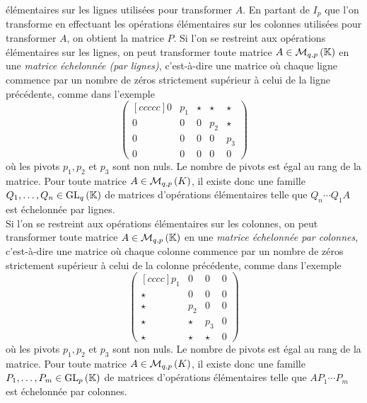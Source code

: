 \documentclass{magnolia}
\begin{document}
\begin{remarques}
  élémentaires sur les lignes utilisées pour transformer $A$. En partant de $I_p$ que
  l'on transforme en effectuant les opérations élémentaires sur les colonnes
  utilisées pour transformer $A$, on obtient la matrice $P$.
\remarque Si l'on se restreint aux opérations élémentaires sur les lignes, on peut
  transformer toute matrice $A\in\mathcal{M}_{q,p}\left(\mathbb{K}\right)$ en une \emph{matrice échelonnée
  (par lignes)}, c'est-à-dire une matrice où chaque ligne commence par un nombre de zéros
  strictement supérieur à celui de la ligne précédente, comme dans l'exemple
  \[\begin{pmatrix}[ccccc]
            0 & p_1     & \star &   \star & \star \\
            0 &       0 &     0 &   p_2   & \star \\
            0 &       0 &     0 &     0   & p_3\\
            0 &       0 &     0 &     0   & 0
  \end{pmatrix}\]
  où les pivots $p_1, p_2$ et $p_3$ sont non nuls. Le nombre de pivots est
  égal au rang de la matrice.
 Pour toute matrice $A\in\mathcal{M}_{q,p}\left(K\right)$, il
  existe donc une famille $Q_1,\ldots,Q_n\in{\rm GL}_{q}\left(\mathbb{K}\right)$ de matrices d'opérations
  élémentaires telle que $Q_n\cdots Q_1A$ est échelonnée par lignes.\\
\remarque Si l'on se restreint aux opérations élémentaires sur les colonnes,
  on peut transformer toute matrice $A\in\mathcal{M}_{q,p}\left(\mathbb{K}\right)$ en une
  \emph{matrice échelonnée par colonnes},
  c'est-à-dire une matrice où chaque colonne commence par un nombre de zéros
  strictement supérieur à celui de la colonne précédente, comme dans l'exemple
  \[\begin{pmatrix}[cccc]
            p_1   &     0 &   0   & 0\\
            \star &     0 &   0   & 0\\
            \star &   p_2 &   0   & 0\\
            \star & \star & p_3   & 0\\
            \star & \star & \star & 0
  \end{pmatrix}\]
  où les pivots $p_1, p_2$ et $p_3$ sont non nuls. Le nombre de pivots est
  égal au rang de la matrice.
  Pour toute matrice $A\in\mathcal{M}_{q,p}\left(K\right)$, il
  existe donc une famille $P_1,\ldots,P_m\in{\rm GL}_{p}\left(\mathbb{K}\right)$ de matrices d'opérations
  élémentaires telle que $A P_1\cdots P_m$ est échelonnée par colonnes.
\end{remarques}

\end{document}
